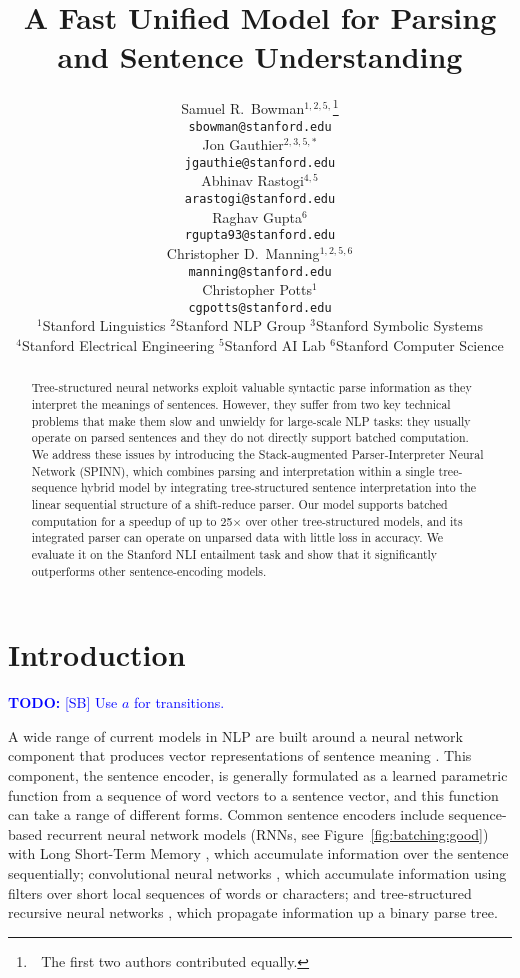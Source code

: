 \documentclass[11pt]{article}
\title{A Fast Unified Model for Parsing and Sentence Understanding}
\author{
Samuel R.\ Bowman$^{1,2,5,}$\thanks{~\,The first two authors contributed equally.} \\
\texttt{\small sbowman@stanford.edu} \\
\And
Jon Gauthier$^{2,3,5,*}$ \\
\texttt{\small jgauthie@stanford.edu} \\
\And
Abhinav Rastogi$^{4,5}$ \\
\texttt{\small arastogi@stanford.edu} \\
\AND
Raghav Gupta$^{6}$ \\
\texttt{\small rgupta93@stanford.edu} \\
\And
Christopher D.\ Manning$^{1,2,5,6}$\\
\texttt{\small manning@stanford.edu}\\
\And
Christopher Potts$^{1}$\\
\texttt{\small cgpotts@stanford.edu}
\AND\\[-3ex]
{$^{1}$Stanford Linguistics\quad
$^{2}$Stanford NLP Group\quad
$^{3}$Stanford Symbolic Systems}\\
{$^{4}$Stanford Electrical Engineering\quad
$^{5}$Stanford AI Lab\quad
$^{6}$Stanford Computer Science}
}
\date{}
\newcommand\todo[1]{\textcolor{blue}{\textbf{TODO:} #1}}
\begin{document}
\maketitle
\begin{abstract}

Tree-structured neural networks exploit valuable syntactic parse information as they interpret the meanings of sentences. However, they suffer from two key technical problems that make them slow and unwieldy for large-scale NLP tasks: they usually operate on parsed sentences and they do not directly support batched computation. We address these issues by introducing the Stack-augmented Parser-Interpreter Neural Network (SPINN), which combines parsing and interpretation within a single tree-sequence hybrid model by integrating tree-structured sentence interpretation into the linear sequential structure of a shift-reduce parser. Our model supports batched computation for a speedup of up to 25$\times$ over other tree-structured models, and its integrated parser can operate on unparsed data with little loss in accuracy. We evaluate it on the Stanford NLI entailment task and show that it significantly outperforms other sentence-encoding models.
\end{abstract}

\section{Introduction}




\todo{[SB] Use $a$ for transitions.}

A wide range of current models in NLP are built around a neural network component that produces vector representations of sentence meaning \citep[e.g.,][]{sutskever2014sequence,tai2015improved}. This component, the sentence encoder, is generally formulated as a learned parametric function from a sequence of word vectors to a sentence vector, and this function can take a range of different forms. Common sentence encoders include sequence-based recurrent neural network models (RNNs, see Figure~\ref{fig:batching:good}) with Long Short-Term Memory \citep[LSTM,][]{hochreiter1997long}, which accumulate information over the sentence sequentially; convolutional neural networks \citep{kalchbrenner2014convolutional,DBLP:journals/corr/ZhangZL15}, which accumulate information using filters over short local sequences of words or characters; and tree-structured recursive neural networks \citep[TreeRNNs,][see Figure~\ref{fig:batching:bad}]{goller1996learning,socher2011parsing}, which propagate information up a binary parse tree.
\end{document}
